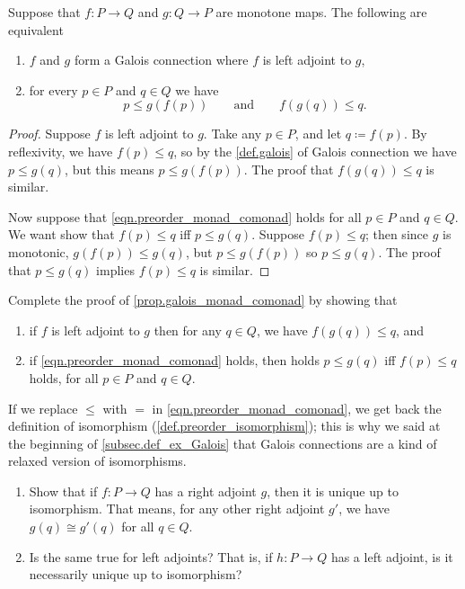\documentclass[7Sketches]{subfiles}
\begin{document}
\begin{proposition}%
\label{prop.galois_monad_comonad}%
Suppose that $f\colon P\to Q$ and $g\colon Q\to P$ are monotone maps. The following are equivalent
\begin{enumerate}[label=(\alph*)]
	\item $f$ and $g$ form a Galois connection where $f$ is left adjoint to $g$,
	\item for every $p\in P$ and $q\in Q$ we have
  \begin{equation}%
\label{eqn.preorder_monad_comonad}
  	p\leq g(f(p))
  	\qquad\text{and}\qquad
  	f(g(q))\leq q.
  \end{equation}
\end{enumerate}
\end{proposition}
\begin{proof}
Suppose $f$ is left adjoint to $g$. Take any $p\in P$, and let $q\coloneqq
f(p)$. By reflexivity, we have $f(p)\leq q$, so by the \cref{def.galois} of
Galois connection we have $p\leq g(q)$, but this means $p\leq g(f(p))$. The
proof that $f(g(q))\leq q$ is similar.

Now suppose that \cref{eqn.preorder_monad_comonad} holds for all $p\in P$ and $q\in Q$. We want show that $f(p)\leq q$ iff $p\leq g(q)$. Suppose $f(p)\leq q$; then since $g$ is monotonic, $g(f(p))\leq g(q)$, but $p\leq g(f(p))$ so $p\leq g(q)$. The proof that $p\leq g(q)$ implies $f(p)\leq q$ is similar.
\end{proof}

\begin{exercise}%
\label{exc.proof_galois_monad}
Complete the proof of \cref{prop.galois_monad_comonad} by showing that
\begin{enumerate}
	\item if $f$ is left adjoint to $g$ then for any $q\in Q$, we have $f(g(q))\leq q$, and 
	\item if \cref{eqn.preorder_monad_comonad} holds, then holds $p\leq g(q)$ iff $f(p)\leq q$ holds, for all $p\in P$ and $q\in Q$.
\qedhere
\end{enumerate}
\end{exercise}


If we replace $\leq$ with $=$ in \cref{eqn.preorder_monad_comonad}, we get back the definition of isomorphism (\cref{def.preorder_isomorphism}); this is why we said at the beginning of \cref{subsec.def_ex_Galois} that Galois connections are a kind of relaxed version of isomorphisms.

\begin{exercise}%
\label{exc.uniqueness_of_adjoints}
 	\begin{enumerate}
		\item Show that if $f\colon P\to Q$ has a right adjoint $g$, then it is unique up to isomorphism. That means, for any other right adjoint $g'$, we have $g(q)\cong g'(q)$ for all $q\in Q$.
  	\item Is the same true for left adjoints? That is, if $h\colon P\to Q$ has a left adjoint, is it necessarily unique up to isomorphism?
	\qedhere
	\end{enumerate}
\end{exercise}
\end{document}
